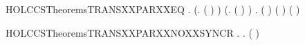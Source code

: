 \begin{SaveVerbatim}{HOLCCSTheoremsTRANSXXPARXXEQ}
\HOLTokenTurnstile{} \HOLSymConst{\HOLTokenForall{}}   .
        \HOLSymConst{\ensuremath{\parallel}}  \HOLTokenTransBegin{}\HOLTokenTransEnd {} \HOLSymConst{\HOLTokenEquiv{}}
       (\HOLSymConst{\HOLTokenExists{}}. ( \HOLSymConst{=}  \HOLSymConst{\ensuremath{\parallel}} ) \HOLSymConst{\HOLTokenConj{}}  \HOLTokenTransBegin{}\HOLTokenTransEnd {}) \HOLSymConst{\HOLTokenDisj{}}
       (\HOLSymConst{\HOLTokenExists{}}. ( \HOLSymConst{=}  \HOLSymConst{\ensuremath{\parallel}} ) \HOLSymConst{\HOLTokenConj{}}  \HOLTokenTransBegin{}\HOLTokenTransEnd {}) \HOLSymConst{\HOLTokenDisj{}}
       \HOLSymConst{\HOLTokenExists{}}  .
           ( \HOLSymConst{=} \HOLConst{\ensuremath{\tau}}) \HOLSymConst{\HOLTokenConj{}} ( \HOLSymConst{=}  \HOLSymConst{\ensuremath{\parallel}} ) \HOLSymConst{\HOLTokenConj{}}  \HOLTokenTransBegin{} \HOLTokenTransEnd {} \HOLSymConst{\HOLTokenConj{}}
            \HOLTokenTransBegin{} ( )\HOLTokenTransEnd {}
\end{SaveVerbatim}
\newcommand{\HOLCCSTheoremsTRANSXXPARXXEQ}{\UseVerbatim{HOLCCSTheoremsTRANSXXPARXXEQ}}
\begin{SaveVerbatim}{HOLCCSTheoremsTRANSXXPARXXNOXXSYNCR}
\HOLTokenTurnstile{} \HOLSymConst{\HOLTokenForall{}} .
        \HOLSymConst{\HOLTokenNotEqual{}}   \HOLSymConst{\HOLTokenImp{}}
       \HOLSymConst{\HOLTokenForall{}}  . \HOLSymConst{\HOLTokenNeg{}}(  \HOLSymConst{\ensuremath{\parallel}}   \HOLTokenTransBegin\HOLConst{\ensuremath{\tau}}\HOLTokenTransEnd {})
\end{SaveVerbatim}
